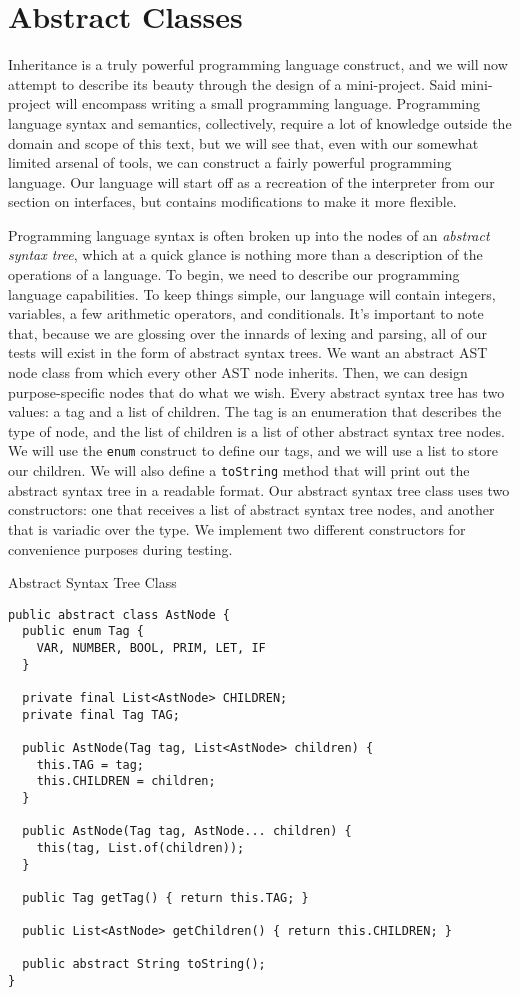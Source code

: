 \section{Abstract Classes}

\example Inheritance is a truly powerful programming language construct, and we will now attempt to describe its beauty through the design of a mini-project. Said mini-project will encompass writing a small programming language. Programming language syntax and semantics, collectively, require a lot of knowledge outside the domain and scope of this text, but we will see that, even with our somewhat limited arsenal of tools, we can construct a fairly powerful programming language. Our language will start off as a recreation of the interpreter from our section on interfaces, but contains modifications to make it more flexible.

Programming language syntax is often broken up into the nodes of an \textit{abstract syntax tree}, which at a quick glance is nothing more than a description of the operations of a language. To begin, we need to describe our programming language capabilities. To keep things simple, our language will contain integers, variables, a few arithmetic operators, and conditionals. It's important to note that, because we are glossing over the innards of lexing and  parsing, all of our tests will exist in the form of abstract syntax trees. We want an abstract AST node class from which every other AST node inherits. Then, we can design purpose-specific nodes that do what we wish. Every abstract syntax tree has two values: a tag and a list of children. The tag is an enumeration that describes the type of node, and the list of children is a list of other abstract syntax tree nodes. We will use the \texttt{enum} construct to define our tags, and we will use a list to store our children. We will also define a \texttt{toString} method that will print out the abstract syntax tree in a readable format. Our abstract syntax tree class uses two constructors: one that receives a list of abstract syntax tree nodes, and another that is variadic over the  type. We implement two different constructors for convenience purposes during testing.

\begin{cl}{Abstract Syntax Tree Class}
\begin{lstlisting}[language=MyJava]
public abstract class AstNode {
  public enum Tag {
    VAR, NUMBER, BOOL, PRIM, LET, IF
  }

  private final List<AstNode> CHILDREN;  
  private final Tag TAG;
 
  public AstNode(Tag tag, List<AstNode> children) {
    this.TAG = tag;
    this.CHILDREN = children;
  }

  public AstNode(Tag tag, AstNode... children) {
    this(tag, List.of(children));
  }

  public Tag getTag() { return this.TAG; }

  public List<AstNode> getChildren() { return this.CHILDREN; }

  public abstract String toString();
}
\end{lstlisting}
\end{cl}

